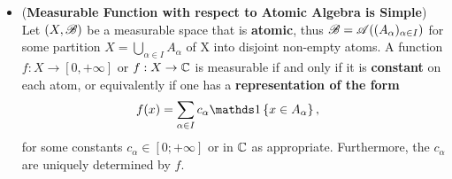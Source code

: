 \documentclass[11pt]{article}
\begin{document}
\begin{itemize}
\item \begin{proposition} (\textbf{Measurable Function with respect to Atomic Algebra is Simple})\\
Let $(X, {\mathscr B})$ be a measurable space that is \textbf{atomic}, thus ${\mathscr B} = {\mathscr A}((A_{\alpha})_{\alpha\in I})$ for some partition $X = \bigcup_{\alpha\in I}A_{\alpha}$ of X into disjoint non-empty atoms. A function $f : X \rightarrow [0,+\infty]$ or $f : X \rightarrow {\mathbb C}$ is measurable if and only if it is \textbf{constant} on each atom, or equivalently if one has a \textbf{representation of the form}
\begin{align*}
f(x)&= \sum_{\alpha \in I}c_{\alpha}\ind{x\in A_{\alpha}},
\end{align*} for some constants $c_{\alpha} \in [0;+\infty]$ or in ${\mathbb C}$ as appropriate. Furthermore, the $c_{\alpha}$ are uniquely determined by $f$.
\end{proposition}
\end{itemize}
\end{document}
